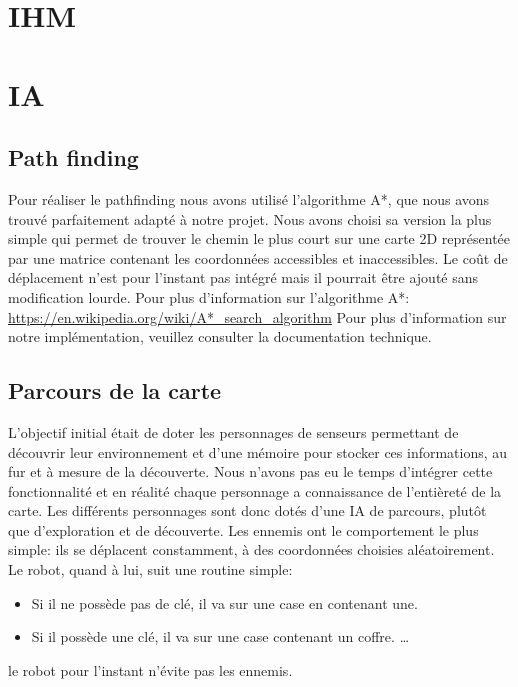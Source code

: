 \documentclass[a4paper 12pts]{article}
\begin{document}
\section{IHM}


\newpage
\section{IA}


\subsection{Path finding}
Pour réaliser le pathfinding nous avons utilisé l'algorithme A*, que nous avons trouvé parfaitement adapté à notre projet. Nous avons choisi sa version la plus simple qui permet de trouver le chemin le plus court sur une carte 2D représentée par une matrice contenant les coordonnées accessibles et inaccessibles. Le coût de déplacement n'est pour l'instant pas intégré mais il pourrait être ajouté sans modification lourde.
Pour plus d'information sur l'algorithme A*: \url{https://en.wikipedia.org/wiki/A*_search_algorithm}
Pour plus d'information sur notre implémentation, veuillez consulter la documentation technique.

\subsection{Parcours de la carte}
L'objectif initial était de doter les personnages de senseurs permettant de découvrir leur environnement et d'une mémoire pour stocker ces informations, au fur et à mesure de la découverte. Nous n'avons pas eu le temps d'intégrer cette fonctionnalité et en réalité chaque personnage a connaissance de l'entièreté de la carte.
Les différents personnages sont donc dotés d'une IA de parcours, plutôt que d'exploration et de découverte.
Les ennemis ont le comportement le plus simple: ils se déplacent constamment, à des coordonnées choisies aléatoirement.
Le robot, quand à lui, suit une routine simple:

\begin{itemize}
  \item Si il ne possède pas de clé, il va sur une case en contenant une.
  \item Si il possède une clé, il va sur une case contenant un coffre. \ldots
\end{itemize}  

le robot pour l'instant n'évite pas les ennemis. 
\newpage
\end{document}
